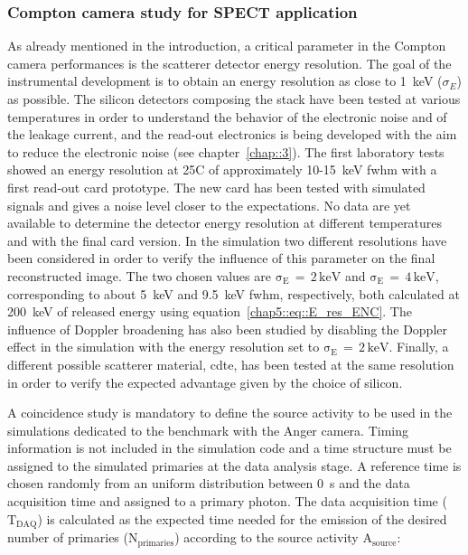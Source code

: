 \subsubsection{Compton camera study for SPECT application}\label{CC_SPECT}
As already mentioned in the introduction, a critical parameter in the Compton camera performances is the scatterer detector energy resolution. The goal of the instrumental development is to obtain an energy resolution as close to 1~keV ($\sigma_{E}$) as possible. The silicon detectors composing the stack have been tested at various temperatures in order to understand the behavior of the electronic noise and of the leakage current, and the read-out electronics is being developed with the aim to reduce the electronic noise (see chapter~\ref{chap::3}). The first laboratory tests showed an energy resolution at 25\textdegree{}C of approximately 10-15~keV \gls{fwhm} with a first read-out card prototype. The new card has been tested with simulated signals and gives a noise level closer to the expectations. No data are yet available to determine the detector energy resolution at different temperatures and with the final card version. In the simulation two different resolutions have been considered in order to verify the influence of this parameter on the final reconstructed image. The two chosen values are $\mathrm{\sigma_{E}\,=\,2\,keV}$ and $\mathrm{\sigma_{E}\,=\,4\,keV}$, corresponding to about 5~keV and 9.5~keV \gls{fwhm}, respectively, both calculated at 200~keV of released energy using equation~\ref{chap5::eq::E_res_ENC}. The influence of Doppler broadening has also been studied by disabling the Doppler effect in the simulation with the energy resolution set to $\mathrm{\sigma_{E}\,=\,2\,keV}$. Finally, a different possible scatterer material, \gls{cdte}, has been tested at the same resolution in order to verify the expected advantage given by the choice of silicon.

A coincidence study is mandatory to define the source activity to be used in the simulations dedicated to the benchmark with the Anger camera. Timing information is not included in the simulation code and a time structure must be assigned to the simulated primaries at the data analysis stage. A reference time is chosen randomly from an uniform distribution between 0~s and the data acquisition time and assigned to a primary photon. The data acquisition time ($\mathrm{T_{DAQ}}$) is calculated as the expected time needed for the emission of the desired number of primaries ($\mathrm{N_{primaries}}$) according to the source activity $\mathrm{A_{source}}$:


